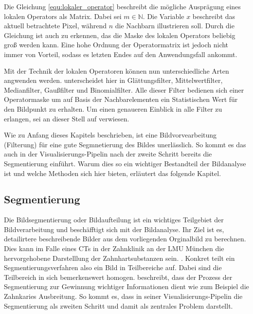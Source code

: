 Die Gleichung \ref{equ:lokaler_operator} beschreibt die mögliche Ausprägung eines
lokalen Operators als Matrix. Dabei sei $m \in \mathbb{N}$. Die Variable $x$ beschreibt
das aktuell betrachtete Pixel, während $n$ die Nachbarn illustrieren soll. Durch
die Gleichung ist auch zu erkennen, das die Maske des lokalen Operators beliebig
groß werden kann. Eine hohe Ordnung der Operatormatrix ist jedoch nicht immer von
Vorteil, sodass es letzten Endes auf den Anwendungsfall ankommt.

Mit der Technik der lokalen Operatoren können nun unterschiedliche Arten
angwenden werden. \citet[Seite 54 - 55]{handels2000} unterscheidet hier in Glättungsfilter,
Mittelwertfilter, Medianfilter, Gaußfilter und Binomialfilter. Alle dieser Filter
bedienen sich einer Operatormaske um auf Basis der Nachbarelementen ein Statistischen
Wert für den Bildpunkt zu erhalten. Um einen genaueren Einblick in alle Filter
zu erlangen, sei an dieser Stell auf \citet[Seite 54 - 55]{handels2000} verwiesen.

Wie zu Anfang dieses Kapitels beschrieben, ist eine Bildvorvearbeitung (Filterung)
für eine gute Segmnetierung des Bildes unerlässlich. So kommt es das auch in der
Visualisierungs-Pipelin nach \citet[Seite 50]{handels2000} der zweite Schritt bereits
die Segmentierung einführt. Warum dies so ein wichtiger Bestandteil der
Bildanalyse ist und welche Methoden sich hier bieten, erläutert das folgende Kapitel.

\pagebreak

\subsection{Segmentierung}
\label{subsec:segmentierung} Die Bildsegmentierung oder Bildaufteilung ist ein
wichtiges Teilgebiet der Bildverarbeitung und beschäfftigt sich mit der
Bildanalyse. Ihr Ziel ist es, detailirtere beschreibende Bilder aus dem
vorliegenden Orginalbild zu berechnen. Dies kann im Falle eines CTs in der Zahnklinik
an der LMU München die hervorgehobene Darstelllung der Zahnhartsubstanzen sein.
\citep[vgl.][Seite 359]{lehmann2013bildverarbeitung}. Konkret teilt ein Segmentierungsverfahren
also ein Bild in Teilbereiche auf. Dabei sind die Teilbereich in sich
bemerkenswert homogen. \citet[Seite 1]{ramesh2021} beschreibt, dass der Prozess
der Segmentierung zur Gewinnung wichtiger Informationen dient wie zum Beispiel
die Zahnkaries Ausbreitung. So kommt es, dass \citet[Seite 50]{handels2000} in
seiner Visualisierungs-Pipelin die Segmentierung als zweiten Schritt und damit
als zentrales Problem darstellt.

